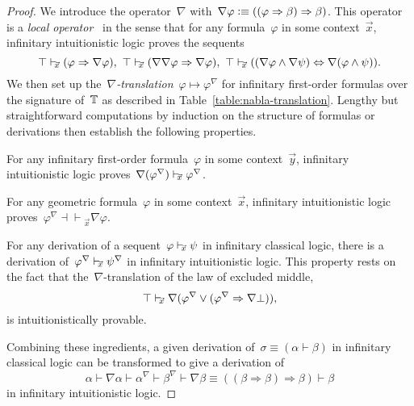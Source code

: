 \documentclass{ws-rv9x6}
\begin{document}
{\begin{proof}
We introduce the operator~$\nabla$ with~$\nabla\varphi \vcentcolon\equiv
((\varphi \Rightarrow \beta) \Rightarrow \beta)$. This operator is a
\emph{local operator}~\cite[Section~14.5]{goldblatt:topoi} in the sense that
for any formula~$\varphi$ in some context~$\vec x$, infinitary intuitionistic
logic proves the sequents
\[
\top \seq{\vec x} (\varphi \Rightarrow \nabla\varphi),\
\top \seq{\vec x} (\nabla\nabla\varphi \Rightarrow \nabla\varphi),\
\top \seq{\vec x} ((\nabla\varphi \wedge \nabla\psi) \Leftrightarrow \nabla(\varphi \wedge \psi)).
\]
We then set up the~\emph{$\nabla$-translation}~$\varphi \mapsto \varphi^\nabla$
for infinitary first-order formulas over the signature of~$\mathbb{T}$ as described in
Table~\ref{table:nabla-translation}.
Lengthy but straightforward computations by induction on the structure of
formulas or derivations then establish the following properties.
\begin{alphlist}
\item For any infinitary first-order formula~$\varphi$ in some context~$\vec y$,
infinitary intuitionistic logic proves~$\nabla(\varphi^\nabla) \mathrel{\vdash\!\!\!_{\vec x}} \varphi^\nabla$.
\item For any geometric formula~$\varphi$ in some context~$\vec x$, infinitary
intuitionistic logic proves~$\varphi^\nabla \mathrel{\dashv\vdash\!\!\!_{\vec x}} \nabla\varphi$.
\item For any derivation of a sequent~$\varphi \mathrel{\vdash\!\!\!_{\vec x}} \psi$ in infinitary
classical logic, there is a derivation of~$\varphi^\nabla \mathrel{\vdash\!\!\!_{\vec x}}
\psi^\nabla$ in infinitary intuitionistic logic. This property rests on the
fact that the~$\nabla$-translation of the law of excluded middle,
\[ \top \mathrel{\vdash\!\!\!_{\vec x}} \nabla(\varphi^\nabla \vee (\varphi^\nabla \Rightarrow \nabla\bot)), \]
is intuitionistically provable.
\end{alphlist}
Combining these ingredients, a given derivation of~$\sigma \equiv (\alpha
\vdash \beta)$ in infinitary classical logic can be transformed to give a derivation of
\[
  \alpha \vdash
  \nabla\alpha \vdash
  \alpha^\nabla \vdash
  \beta^\nabla \vdash
  \nabla\beta \equiv
  ((\beta \Rightarrow \beta) \Rightarrow \beta) \vdash
  \beta
\]
in infinitary intuitionistic logic.


\end{proof}}
\end{document}
